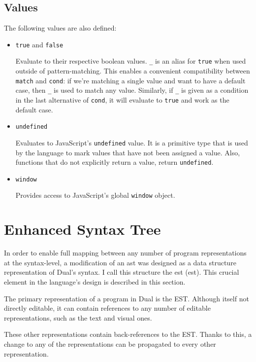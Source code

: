 \subsection{Values}
The following values are also defined:
\begin{itemize}
    \item \texttt{true} and \texttt{false}
    
    Evaluate to their respective boolean values. \texttt{\_} is an alias for \texttt{true} when used outside of pattern-matching. This enables a convenient compatibility between \texttt{match} and \texttt{cond}: if we're matching a single value and want to have a default case, then \texttt{\_} is used to match any value. Similarly, if \texttt{\_} is given as a condition in the last alternative of \texttt{cond}, it will evaluate to \texttt{true} and work as the default case.
    
    \item \texttt{undefined}
    
    Evaluates to JavaScript's \texttt{undefined} value. It is a primitive type that is used by the language to mark values that have not been assigned a value. Also, functions that do not explicitly return a value, return \texttt{undefined}\cite{mdn_undefined}.
    
    \item \texttt{window} 
    
    Provides access to JavaScript's global \texttt{window} object\cite{mdn_window}.
\end{itemize}

\section{Enhanced Syntax Tree}\label{sec:est}
In order to enable full mapping between any number of program representations at the syntax-level, a modification of an \acrshort{ast} was designed as a data structure representation of Dual's syntax. I call this structure the \acrlong{est} (\acrshort{est}). This crucial element in the language's design is described in this section.

The primary representation of a program in Dual is the EST. Although itself not directly editable, it can contain references to any number of editable representations, such as the text and visual ones.

These other representations contain back-references to the EST. Thanks to this, a change to any of the representations can be propagated to every other representation.

